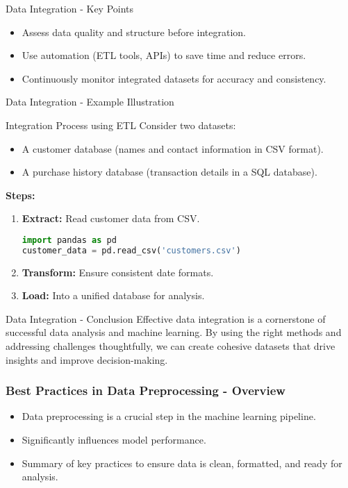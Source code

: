 \documentclass[aspectratio=169]{beamer}
\begin{document}
\begin{frame}[fragile]{Data Integration - Key Points}
    \begin{itemize}
        \item Assess data quality and structure before integration.
        \item Use automation (ETL tools, APIs) to save time and reduce errors.
        \item Continuously monitor integrated datasets for accuracy and consistency.
    \end{itemize}
\end{frame}

\begin{frame}[fragile]{Data Integration - Example Illustration}
    \begin{block}{Integration Process using ETL}
        Consider two datasets:
        \begin{itemize}
            \item A customer database (names and contact information in CSV format).
            \item A purchase history database (transaction details in a SQL database).
        \end{itemize}
        
        \textbf{Steps:}
        \begin{enumerate}
            \item \textbf{Extract:} Read customer data from CSV.
            \begin{lstlisting}[language=python]
import pandas as pd
customer_data = pd.read_csv('customers.csv')
            \end{lstlisting}
            \item \textbf{Transform:} Ensure consistent date formats.
            \item \textbf{Load:} Into a unified database for analysis.
        \end{enumerate}
    \end{block}
\end{frame}

\begin{frame}[fragile]{Data Integration - Conclusion}
    Effective data integration is a cornerstone of successful data analysis and machine learning. By using the right methods and addressing challenges thoughtfully, we can create cohesive datasets that drive insights and improve decision-making.
\end{frame}

\begin{frame}[fragile]
    \frametitle{Best Practices in Data Preprocessing - Overview}
    \begin{itemize}
        \item Data preprocessing is a crucial step in the machine learning pipeline.
        \item Significantly influences model performance.
        \item Summary of key practices to ensure data is clean, formatted, and ready for analysis.
    \end{itemize}
\end{frame}
\end{document}
